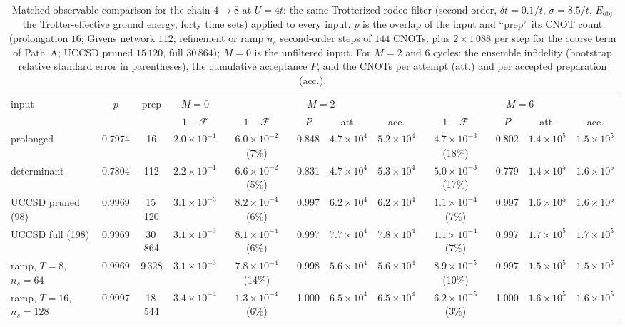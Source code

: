 \documentclass[
  aps,
  prc,
  reprint,
  superscriptaddress,
  floatfix,
  nofootinbib
]{revtex4-2}
\newcommand{\Eobj}{E_{\mathrm{obj}}}
\begin{document}
\begin{table}[t]
  \caption{Matched-observable comparison for the chain $4\to8$ at $U=4t$:
  the same Trotterized rodeo filter (second order, $\delta t=0.1/t$,
  $\sigma=8.5/t$, $\Eobj$ the Trotter-effective ground energy, forty time
  sets) applied to every input.  $p$ is the overlap of the input and
  ``prep'' its CNOT count (prolongation $16$; Givens network $112$;
  refinement or ramp $n_s$ second-order steps of $144$ CNOTs, plus
  $2\times1\,088$ per step for the coarse term of Path~A; UCCSD pruned
  $15\,120$, full $30\,864$); $M=0$ is the unfiltered input.  For $M=2$ and
  $6$ cycles: the ensemble infidelity (bootstrap relative standard error in
  parentheses), the cumulative acceptance $P$, and the CNOTs per attempt
  (att.) and per accepted preparation (acc.).}
  \label{tab:budget}
  \scriptsize
  \begin{ruledtabular}
  \begin{tabular}{lcc|c|cccc|cccc}
  input & $p$ & prep & $M=0$ & \multicolumn{4}{c|}{$M=2$} & \multicolumn{4}{c}{$M=6$}\\
  & & & $1-\mathcal F$ & $1-\mathcal F$ & $P$ & att. & acc. & $1-\mathcal F$ & $P$ & att. & acc.\\
  \hline
  prolonged & 0.7974 & 16 & $2.0{\times}10^{-1}$ & $6.0{\times}10^{-2}$ (7\%) & 0.848 & $4.7{\times}10^{4}$ & $5.2{\times}10^{4}$ & $4.7{\times}10^{-3}$ (18\%) & 0.802 & $1.4{\times}10^{5}$ & $1.5{\times}10^{5}$\\
  determinant & 0.7804 & 112 & $2.2{\times}10^{-1}$ & $6.6{\times}10^{-2}$ (5\%) & 0.831 & $4.7{\times}10^{4}$ & $5.3{\times}10^{4}$ & $5.0{\times}10^{-3}$ (17\%) & 0.779 & $1.4{\times}10^{5}$ & $1.6{\times}10^{5}$\\
  UCCSD pruned (98) & 0.9969 & 15\,120 & $3.1{\times}10^{-3}$ & $8.2{\times}10^{-4}$ (6\%) & 0.997 & $6.2{\times}10^{4}$ & $6.2{\times}10^{4}$ & $1.1{\times}10^{-4}$ (7\%) & 0.997 & $1.6{\times}10^{5}$ & $1.6{\times}10^{5}$\\
  UCCSD full (198) & 0.9969 & 30\,864 & $3.1{\times}10^{-3}$ & $8.1{\times}10^{-4}$ (6\%) & 0.997 & $7.7{\times}10^{4}$ & $7.8{\times}10^{4}$ & $1.1{\times}10^{-4}$ (7\%) & 0.997 & $1.7{\times}10^{5}$ & $1.7{\times}10^{5}$\\
  ramp, $T=8$, $n_s=64$ & 0.9969 & 9\,328 & $3.1{\times}10^{-3}$ & $7.8{\times}10^{-4}$ (14\%) & 0.998 & $5.6{\times}10^{4}$ & $5.6{\times}10^{4}$ & $8.9{\times}10^{-5}$ (10\%) & 0.997 & $1.5{\times}10^{5}$ & $1.5{\times}10^{5}$\\
  ramp, $T=16$, $n_s=128$ & 0.9997 & 18\,544 & $3.4{\times}10^{-4}$ & $1.3{\times}10^{-4}$ (6\%) & 1.000 & $6.5{\times}10^{4}$ & $6.5{\times}10^{4}$ & $6.2{\times}10^{-5}$ (3\%) & 1.000 & $1.6{\times}10^{5}$ & $1.6{\times}10^{5}$\\

\end{tabular}
\end{ruledtabular}
\end{table}
\end{document}
